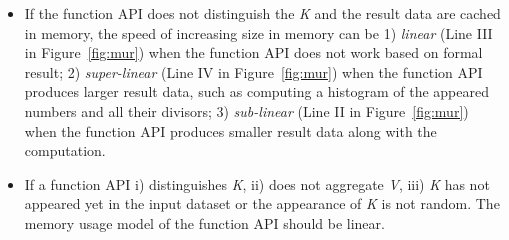\begin{itemize}

\item If the function API does not distinguish the \textit{K} and the result data are cached in memory, the speed of increasing size in memory can be 1) \textit{linear} (Line III in Figure~\ref{fig:mur}) when the function API does not work based on formal result; 2) \textit{super-linear} (Line IV in Figure~\ref{fig:mur}) when the function API produces larger result data, such as computing a histogram of the appeared numbers and all their divisors; 3) \textit{sub-linear} (Line II in Figure~\ref{fig:mur}) when the function API produces smaller result data along with the computation. 

\item If a function API i) distinguishes \textit{K}, ii) does not aggregate \textit{V}, iii) \textit{K} has not appeared yet in the input dataset or the appearance of \textit{K} is not random. The memory usage model of the function API should be linear.

\end{itemize}




